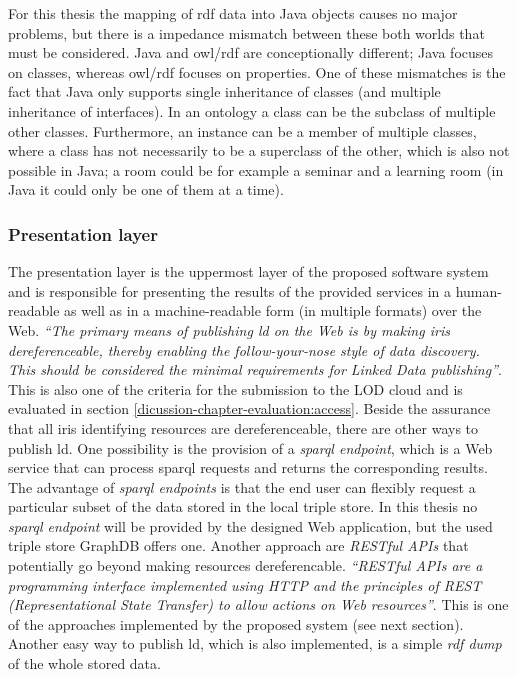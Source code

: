 \documentclass[draft,final]{vutinfth} %
\begin{document}
For this thesis the mapping of \gls{rdf} data into Java objects causes no major problems, but there is a impedance mismatch between these both worlds that must be considered. Java and \gls{owl}/\gls{rdf} are conceptionally different; Java focuses on classes, whereas \gls{owl}/\gls{rdf}  focuses on properties. One of these mismatches is the fact that Java only supports single inheritance of classes (and multiple inheritance of interfaces). In an ontology a class can be the subclass of multiple other classes. Furthermore, an instance can be a member of multiple classes, where a class has not necessarily to be a superclass of the other, which is also not possible in Java; a room could be for example a seminar and a learning room (in Java it could only be one of them at a time).

\subsubsection{Presentation layer}
The presentation layer is the uppermost layer of the proposed software system and is responsible for presenting the results of the provided services in a human-readable as well as in a machine-readable form (in multiple formats) over the Web. \textit{``The primary means of publishing \gls{ld} on the Web is by making \gls{iri}s dereferenceable, thereby enabling the follow-your-nose style of data discovery. This should be considered the minimal requirements for Linked Data publishing''}\cite{bizer_linked_2009}. This is also one of the criteria for the submission to the LOD cloud and is evaluated in section \ref{dicussion-chapter-evaluation:access}. Beside the assurance that all \gls{iri}s identifying resources are dereferenceable, there are other ways to publish \gls{ld}. One possibility is the provision of a \textit{\gls{sparql} endpoint}, which is a Web service that can process \gls{sparql} requests and returns the corresponding results. The advantage of \textit{\gls{sparql} endpoints} is that the end user can flexibly request a particular subset of the data stored in the local triple store. In this thesis no \textit{\gls{sparql} endpoint} will be provided by the designed Web application, but the used triple store GraphDB offers one. Another approach are \textit{RESTful APIs} that potentially go beyond making resources dereferencable. \textit{``RESTful APIs are a programming interface implemented using HTTP and the principles of REST (Representational State Transfer) to allow actions on Web resources''}\cite{hyland_linked_????}. This is one of the approaches implemented by the proposed system (see next section). Another easy way to publish \gls{ld}, which is also implemented, is a simple \textit{\gls{rdf} dump} of the whole stored data. 
\end{document}
